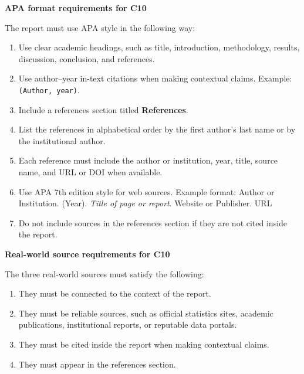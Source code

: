 \documentclass[12pt]{article}
\newcommand{\SubsectionBox}[1]{%
	\noindent\colorbox{gray!30}{%
		\parbox{\linewidth}{\textbf{#1}}%
	}\par\vspace{0.35cm}%
}
\begin{document}
	\SubsectionBox{APA format requirements for C10}
	The report must use APA style in the following way:
	\begin{enumerate}
		\item Use clear academic headings, such as title, introduction, methodology, results, discussion, conclusion, and references.
		\item Use author--year in-text citations when making contextual claims. Example: \texttt{(Author, year)}.
		\item Include a references section titled \textbf{References}.
		\item List the references in alphabetical order by the first author's last name or by the institutional author.
		\item Each reference must include the author or institution, year, title, source name, and URL or DOI when available.
		\item Use APA 7th edition style for web sources. Example format: Author or Institution. (Year). \textit{Title of page or report}. Website or Publisher. URL
		\item Do not include sources in the references section if they are not cited inside the report.
	\end{enumerate}
	
	\SubsectionBox{Real-world source requirements for C10}
	The three real-world sources must satisfy the following:
	\begin{enumerate}
		\item They must be connected to the context of the report.
		\item They must be reliable sources, such as official statistics sites, academic publications, institutional reports, or reputable data portals.
		\item They must be cited inside the report when making contextual claims.
		\item They must appear in the references section.
	\end{enumerate}
	
\end{document}
